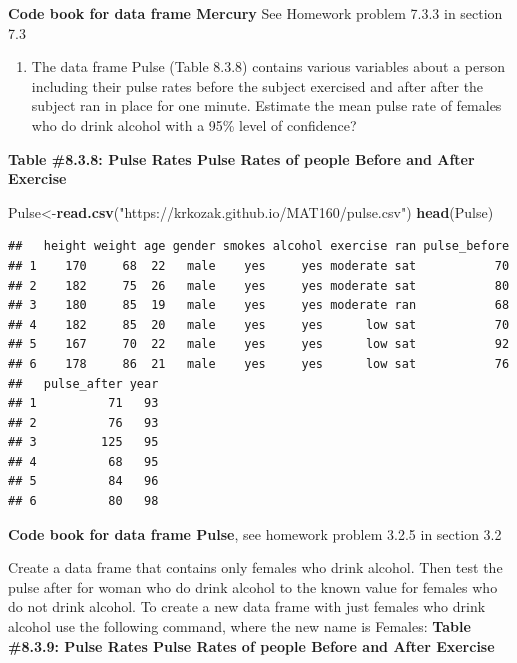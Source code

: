 \documentclass[]{book}
\newenvironment{Shaded}{\begin{snugshade}}{\end{snugshade}}
\newcommand{\KeywordTok}[1]{\textcolor[rgb]{0.13,0.29,0.53}{\textbf{#1}}}
\newcommand{\NormalTok}[1]{#1}
\newcommand{\OperatorTok}[1]{\textcolor[rgb]{0.81,0.36,0.00}{\textbf{#1}}}
\newcommand{\StringTok}[1]{\textcolor[rgb]{0.31,0.60,0.02}{#1}}
\providecommand{\tightlist}{%
  \setlength{\itemsep}{0pt}\setlength{\parskip}{0pt}}
\begin{document}
\textbf{Code book for data frame Mercury} See Homework problem 7.3.3 in section 7.3

\begin{enumerate}
\def\labelenumi{\arabic{enumi}.}
\setcounter{enumi}{3}
\tightlist
\item
  The data frame Pulse (Table 8.3.8) contains various variables about a person including their pulse rates before the subject exercised and after after the subject ran in place for one minute. Estimate the mean pulse rate of females who do drink alcohol with a 95\% level of confidence?
\end{enumerate}

\textbf{Table \#8.3.8: Pulse Rates Pulse Rates of people Before and After Exercise}

\begin{Shaded}
\begin{Highlighting}[]
\NormalTok{Pulse<-}\KeywordTok{read.csv}\NormalTok{(}\StringTok{"https://krkozak.github.io/MAT160/pulse.csv"}\NormalTok{)}
\KeywordTok{head}\NormalTok{(Pulse)}
\end{Highlighting}
\end{Shaded}

\begin{verbatim}
##   height weight age gender smokes alcohol exercise ran pulse_before
## 1    170     68  22   male    yes     yes moderate sat           70
## 2    182     75  26   male    yes     yes moderate sat           80
## 3    180     85  19   male    yes     yes moderate ran           68
## 4    182     85  20   male    yes     yes      low sat           70
## 5    167     70  22   male    yes     yes      low sat           92
## 6    178     86  21   male    yes     yes      low sat           76
##   pulse_after year
## 1          71   93
## 2          76   93
## 3         125   95
## 4          68   95
## 5          84   96
## 6          80   98
\end{verbatim}

\textbf{Code book for data frame Pulse}, see homework problem 3.2.5 in section 3.2

Create a data frame that contains only females who drink alcohol. Then test the pulse after for woman who do drink alcohol to the known value for females who do not drink alcohol. To create a new data frame with just females who drink alcohol use the following command, where the new name is Females:
\textbf{Table \#8.3.9: Pulse Rates Pulse Rates of people Before and After Exercise}

\begin{Shaded}
\end{Shaded}
\end{document}
